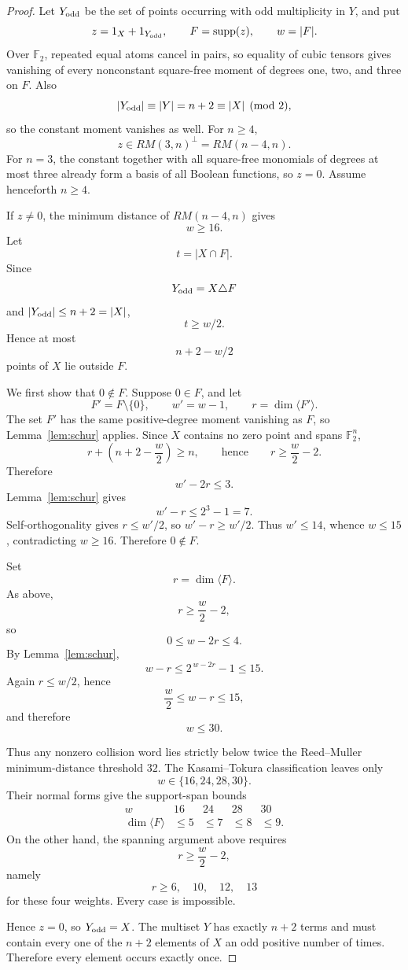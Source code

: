 \documentclass[11pt]{article}
\theoremstyle{definition}
\newcommand{\F}{\mathbb F}
\newcommand{\supp}{\operatorname{supp}}
\begin{document}
\begin{proof}
Let \(Y_{\rm odd}\) be the set of points occurring with odd multiplicity in \(Y\), and put
\[
z=1_X+1_{Y_{\rm odd}},\qquad F=\supp(z),\qquad w=|F|.
\]
Over \(\F_2\), repeated equal atoms cancel in pairs, so equality of cubic tensors gives vanishing of every nonconstant square-free moment of degrees one, two, and three on \(F\). Also
\[
|Y_{\rm odd}|\equiv |Y|=n+2\equiv |X|\pmod2,
\]
so the constant moment vanishes as well. For \(n\ge4\),
\[
z\in RM(3,n)^\perp=RM(n-4,n).
\]
For \(n=3\), the constant together with all square-free monomials of degrees at most three already form a basis of all Boolean functions, so \(z=0\). Assume henceforth \(n\ge4\).

If \(z\ne0\), the minimum distance of \(RM(n-4,n)\) gives
\[
w\ge16.
\]
Let
\[
t=|X\cap F|.
\]
Since
\[
Y_{\rm odd}=X\triangle F
\]
and \(|Y_{\rm odd}|\le n+2=|X|\),
\[
t\ge w/2.
\]
Hence at most
\[
n+2-w/2
\]
points of \(X\) lie outside \(F\).

We first show that \(0\notin F\). Suppose \(0\in F\), and let
\[
F'=F\setminus\{0\},\qquad w'=w-1,\qquad r=\dim\langle F'\rangle.
\]
The set \(F'\) has the same positive-degree moment vanishing as \(F\), so Lemma~\ref{lem:schur} applies. Since \(X\) contains no zero point and spans \(\F_2^n\),
\[
r+\left(n+2-\frac w2\right)\ge n,
\qquad\text{hence}\qquad
r\ge\frac w2-2.
\]
Therefore
\[
w'-2r\le3.
\]
Lemma~\ref{lem:schur} gives
\[
w'-r\le2^3-1=7.
\]
Self-orthogonality gives \(r\le w'/2\), so \(w'-r\ge w'/2\). Thus \(w'\le14\), whence \(w\le15\), contradicting \(w\ge16\). Therefore \(0\notin F\).

Set
\[
r=\dim\langle F\rangle.
\]
As above,
\[
r\ge\frac w2-2,
\]
so
\[
0\le w-2r\le4.
\]
By Lemma~\ref{lem:schur},
\[
w-r\le 2^{\,w-2r}-1\le15.
\]
Again \(r\le w/2\), hence
\[
\frac w2\le w-r\le15,
\]
and therefore
\[
w\le30.
\]

Thus any nonzero collision word lies strictly below twice the Reed--Muller minimum-distance threshold \(32\). The Kasami--Tokura classification leaves only
\[
w\in\{16,24,28,30\}.
\]
Their normal forms give the support-span bounds
\[
\begin{array}{c|rrrr}
w&16&24&28&30\\ \hline
\dim\langle F\rangle&\le5&\le7&\le8&\le9.
\end{array}
\]
On the other hand, the spanning argument above requires
\[
r\ge\frac w2-2,
\]
namely
\[
r\ge6,\quad10,\quad12,\quad13
\]
for these four weights. Every case is impossible.

Hence \(z=0\), so \(Y_{\rm odd}=X\). The multiset \(Y\) has exactly \(n+2\) terms and must contain every one of the \(n+2\) elements of \(X\) an odd positive number of times. Therefore every element occurs exactly once.
\end{proof}
\end{document}
